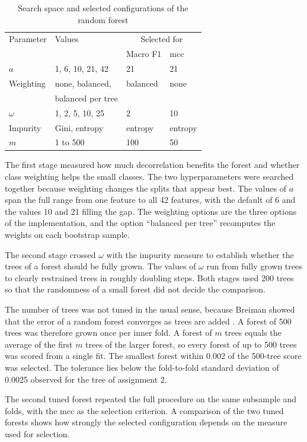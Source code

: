 \documentclass[conference]{IEEEtran}
\begin{document}
\begin{table}[t]
\centering
\caption{Search space and selected configurations of the random forest}
\label{tab:search}
\small
\begin{tabular}{llll}
\toprule
Parameter & Values & \multicolumn{2}{c}{Selected for} \\
& & Macro F1 & \acrshort{mcc} \\
\midrule
$a$ & 1, 6, 10, 21, 42 & 21 & 21 \\
Weighting & none, balanced, & balanced & none \\
& balanced per tree & & \\
$\omega$ & 1, 2, 5, 10, 25 & 2 & 10 \\
Impurity & Gini, entropy & entropy & entropy \\
$m$ & 1 to 500 & 100 & 50 \\
\bottomrule
\end{tabular}
\end{table}

The first stage measured how much decorrelation benefits the forest and whether
class weighting helps the small classes. The two hyperparameters were searched
together because weighting changes the splits that appear best. The values of $a$
span the full range from one feature to all 42 features, with the default of 6 and
the values 10 and 21 filling the gap. The weighting options are the three options of
the implementation, and the option ``balanced per tree'' recomputes the weights on
each bootstrap sample.

The second stage crossed $\omega$ with the impurity measure to establish whether the
trees of a forest should be fully grown. The values of $\omega$ run from fully grown
trees to clearly restrained trees in roughly doubling steps. Both stages used 200
trees so that the randomness of a small forest did not decide the comparison.

The number of trees was not tuned in the usual sense, because Breiman showed that
the error of a random forest converges as trees are added \cite{breiman2001}. A
forest of 500 trees was therefore grown once per inner fold. A forest of $m$ trees
equals the average of the first $m$ trees of the larger forest, so every forest of
up to 500 trees was scored from a single fit. The smallest forest within 0.002 of
the 500-tree score was selected. The tolerance lies below the fold-to-fold standard
deviation of 0.0025 observed for the tree of assignment 2.

The second tuned forest repeated the full procedure on the same subsample and folds,
with the \gls{mcc} as the selection criterion. A comparison of the two tuned forests
shows how strongly the selected configuration depends on the measure used for
selection.
\end{document}
